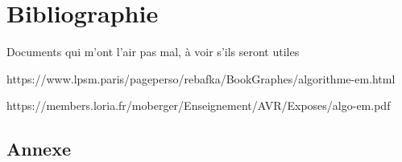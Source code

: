 \documentclass[frenchb]{report}
\newcommand{\1}{\mathbbm{1}}
\theoremstyle{definition}\newtheorem{defn}{Définition}
\theoremstyle{definition}\newtheorem{exm}{Exemple}
\theoremstyle{definition}\newtheorem{nota}{Notation}
\theoremstyle{definition}\newtheorem{rem}{Remarque}
\begin{document}
\chapter*{Bibliographie}
 
Documents qui m'ont l'air pas mal, à voir s'ils seront utiles

https://www.lpsm.paris/pageperso/rebafka/BookGraphes/algorithme-em.html

https://members.loria.fr/moberger/Enseignement/AVR/Exposes/algo-em.pdf


\pagebreak
\begin{appendix}
\chapter{Annexe}

\end{appendix}
\end{document}

